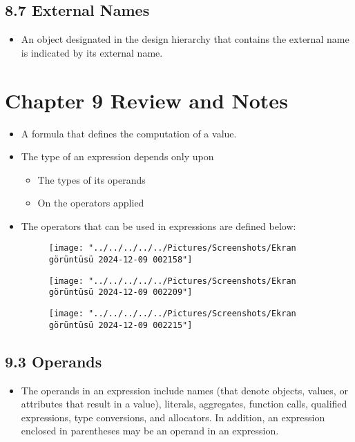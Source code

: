 \documentclass[a4paper,12pt]{article}
\begin{document}
	\subsection*{8.7 External Names}
	\begin{itemize}
		\item An object designated in the design hierarchy that contains the external name is indicated by its external name.
	\end{itemize}
	
	
	\section*{Chapter 9 Review and Notes}
	\begin{itemize}
		\item A formula that defines the computation of a value.
		\item The type of an expression depends only upon 
		\begin{itemize}
			\item The types of its operands 
			\item On the operators applied
		\end{itemize}
		\item The operators that can be used in expressions are defined below:
		\begin{figure}
			\centering
			\texttt{[image: "../../../../../Pictures/Screenshots/Ekran görüntüsü 2024-12-09 002158"]}
			\caption{}
			\label{fig:ekran-goruntusu-2024-12-09-002158}
		\end{figure}
		\begin{figure}
			\centering
			\texttt{[image: "../../../../../Pictures/Screenshots/Ekran görüntüsü 2024-12-09 002209"]}
			\caption{}
			\label{fig:ekran-goruntusu-2024-12-09-002209}
		\end{figure}
		\begin{figure}
			\centering
			\texttt{[image: "../../../../../Pictures/Screenshots/Ekran görüntüsü 2024-12-09 002215"]}
			\caption{}
			\label{fig:ekran-goruntusu-2024-12-09-002215}
		\end{figure}	
	\end{itemize}
	
	\subsection*{9.3 Operands}
	\begin{itemize}
		\item The operands in an expression include names (that denote objects, values, or attributes that result in a value),
		literals, aggregates, function calls, qualified expressions, type conversions, and allocators. In addition, an
		expression enclosed in parentheses may be an operand in an expression.
	\end{itemize}
	
\end{document}
